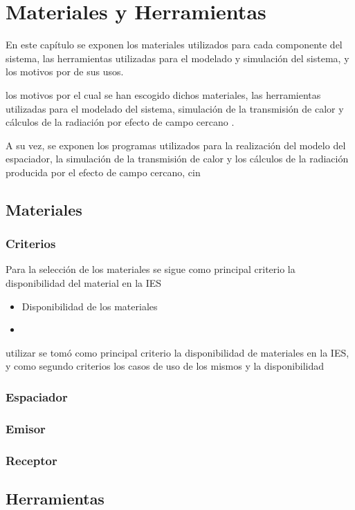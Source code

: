 \chapter{Materiales y Herramientas}

En este capítulo se exponen los materiales utilizados para cada componente del sistema, las herramientas utilizadas para el modelado y simulación del sistema, y los motivos por de sus usos.

 los motivos por el cual se han escogido dichos materiales, las herramientas utilizadas para el modelado del sistema, simulación de la transmisión de calor y cálculos de la radiación por efecto de campo cercano .

A su vez, se exponen los programas utilizados para la realización del modelo del espaciador, la simulación de la transmisión de calor y los cálculos de la radiación producida por el efecto de campo cercano, cin
\section{Materiales}
\subsection{Criterios}
Para la selección de los materiales se sigue como principal criterio la disponibilidad del material en la IES
\begin{itemize}
	\item Disponibilidad de los materiales
	\item 
\end{itemize} utilizar se tomó como principal criterio la disponibilidad de materiales en la IES, y como segundo criterios  los casos de uso de los mismos y la disponibilidad
\subsection{Espaciador}

\subsection{Emisor}
\subsection{Receptor}

\section{Herramientas}
